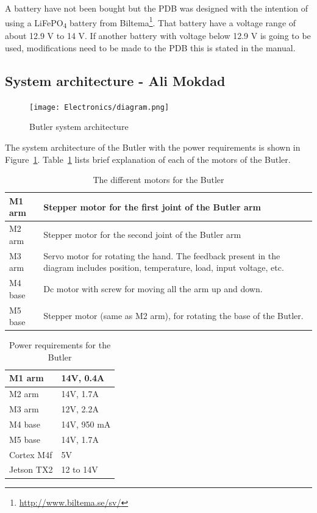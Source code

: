 A battery have not been bought but the PDB was designed with the intention of using a LiFePO\textsubscript{4} battery from Biltema\footnote{\url{http://www.biltema.se/sv/}}. That battery have a voltage range of about 12.9 V to 14 V. If another battery with voltage below 12.9 V is going to be used, modifications need to be made to the PDB this is stated in the manual.

\subsection{System architecture - Ali Mokdad}
\begin{figure}[ht!]
\centering 
\texttt{[image: Electronics/diagram.png]}
\caption{Butler system architecture}
\label{fig:Butler system architecture}
\end{figure}

The system architecture of the Butler with the power requirements is shown in Figure~\ref{fig:Butler system architecture}. 
Table~\ref{table: The different motors for the Butler} lists brief explanation of each of the motors of the Butler.

\begin{table}[h!]
\centering
  \begin{tabular}{ | p{2cm}| p{9cm} |}
    \hline
    M1 arm  & Stepper motor for the first joint of the Butler arm   \\ \hline
    M2 arm  & Stepper motor for the second joint of the Butler arm   \\ \hline
    M3 arm  & Servo motor for rotating the hand. The feedback present in the diagram includes position, temperature, load, input voltage, etc.   \\ \hline
    M4 base & Dc motor with screw for moving all the arm up and down.\\ \hline
    M5 base & Stepper motor (same as M2 arm), for rotating the base of the Butler.\\
    \hline
  \end{tabular}
\caption{The different motors for the Butler}
\label{table: The different motors for the Butler}
\end{table}

\begin{table}[ht!]
\centering
  \begin{tabular}{ | p{2cm}| p{3cm} |}
    \hline
    M1 arm  & 14V, 0.4A    \\ \hline
    M2 arm  & 14V, 1.7A    \\ \hline
    M3 arm  & 12V, 2.2A    \\ \hline
    M4 base & 14V, 950 mA  \\ \hline
    M5 base & 14V, 1.7A    \\ \hline
    Cortex M4f & 5V        \\ \hline
    Jetson TX2 & 12 to 14V \\ \hline
  \end{tabular}
\caption{ Power requirements for the Butler}
\label{table: Power requirements for the Butler}
\end{table}

